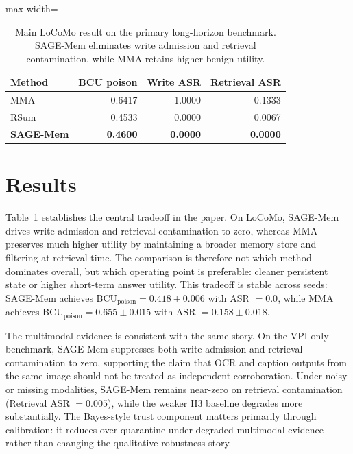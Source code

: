 \documentclass{article}
\begin{document}
\begin{table}[t]
\centering
\small
\setlength{\tabcolsep}{4.8pt}
\renewcommand{\arraystretch}{0.96}
\begin{adjustbox}{max width=\columnwidth}
\begin{tabular}{lrrr}
\toprule
Method & BCU poison & Write ASR & Retrieval ASR \\
\midrule
MMA & 0.6417 & 1.0000 & 0.1333 \\
RSum & 0.4533 & 0.0000 & 0.0067 \\
\textbf{SAGE-Mem} & \textbf{0.4600} & \textbf{0.0000} & \textbf{0.0000} \\
\bottomrule
\end{tabular}
\end{adjustbox}
\caption{Main LoCoMo result on the primary long-horizon benchmark. SAGE-Mem eliminates write admission and retrieval contamination, while MMA retains higher benign utility.}
\label{tab:locomo-main-3p}
\end{table}

\section{Results}

Table~\ref{tab:locomo-main-3p} establishes the central tradeoff in the paper. On LoCoMo, SAGE-Mem drives write admission and retrieval contamination to zero, whereas MMA preserves much higher utility by maintaining a broader memory store and filtering at retrieval time. The comparison is therefore not which method dominates overall, but which operating point is preferable: cleaner persistent state or higher short-term answer utility. This tradeoff is stable across seeds: SAGE-Mem achieves BCU$_{\text{poison}}=0.418\pm0.006$ with ASR \(=0.0\), while MMA achieves BCU$_{\text{poison}}=0.655\pm0.015$ with ASR \(=0.158\pm0.018\).

The multimodal evidence is consistent with the same story. On the VPI-only benchmark, SAGE-Mem suppresses both write admission and retrieval contamination to zero, supporting the claim that OCR and caption outputs from the same image should not be treated as independent corroboration. Under noisy or missing modalities, SAGE-Mem remains near-zero on retrieval contamination (Retrieval ASR \(=0.005\)), while the weaker H3 baseline degrades more substantially. The Bayes-style trust component matters primarily through calibration: it reduces over-quarantine under degraded multimodal evidence rather than changing the qualitative robustness story.
\end{document}

